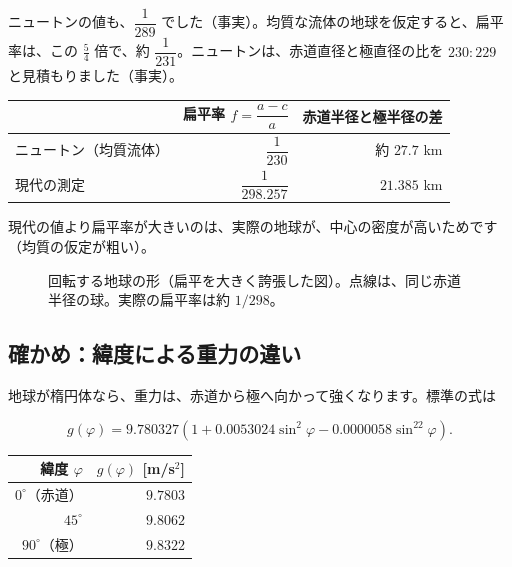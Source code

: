 \documentclass[a4paper,11pt,openany]{ltjsbook}
\begin{document}
ニュートンの値も、$\dfrac1{289}$ でした（事実）。均質な流体の地球を仮定すると、扁平率は、この $\frac54$ 倍で、約 $\dfrac1{231}$。ニュートンは、赤道直径と極直径の比を $230:229$ と見積もりました（事実）。

\begin{center}
\begin{tabular}{lrr}
\toprule
 & 扁平率 $f=\dfrac{a-c}{a}$ & 赤道半径と極半径の差\\
\midrule
ニュートン（均質流体） & $\dfrac1{230}$ & 約 $27.7$ km\\
現代の測定 & $\dfrac1{298.257}$ & $21.385$ km\\
\bottomrule
\end{tabular}
\end{center}

現代の値より扁平率が大きいのは、実際の地球が、中心の密度が高いためです（均質の仮定が粗い）。

\begin{figure}[htbp]
\centering
{}
\caption{回転する地球の形（扁平を大きく誇張した図）。点線は、同じ赤道半径の球。実際の扁平率は約 $1/298$。}
\end{figure}

\subsection{確かめ：緯度による重力の違い}

地球が楕円体なら、重力は、赤道から極へ向かって強くなります。標準の式は

\[
g(\varphi)=9.780327\left(1+0.0053024\sin^2\varphi-0.0000058\sin^22\varphi\right).
\]

\begin{center}
\begin{tabular}{rr}
\toprule
緯度 $\varphi$ & $g(\varphi)$ [m/s$^2$]\\
\midrule
$0^\circ$（赤道） & $9.7803$\\
$45^\circ$ & $9.8062$\\
$90^\circ$（極） & $9.8322$\\
\bottomrule
\end{tabular}
\end{center}
\end{document}
